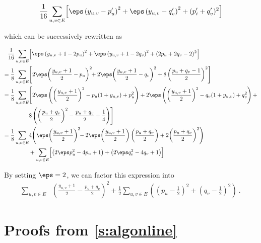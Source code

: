 \begin{equation*}
  \frac{1}{16} \sum_{u,v \in E} \Bigl[ \eps\left(y_{u,v} - p_u'\right)^2 + \eps\left(y_{u,v} - q_v'\right)^2 + (p'_i+q_v')^2 \Bigr]
\end{equation*}

which can be successively rewritten as

\begin{align*}
  \frac{1}{16} \sum_{u,v \in E} & \Bigl[ \eps\left(y_{u,v}+1 - 2p_u\right)^2 + \eps\left(y_{u,v}+1 - 2q_v\right)^2
	+ (2p_u +2q_v -2)^2 \Bigr]
\\=
	\frac{1}{8} \sum_{u,v \in E} & \Biggl[ 2\eps\!\left(\frac{y_{u,v}+1}{2} - p_u\right)^2\!\! +  2\eps\!\left(\frac{y_{u,v}+1}{2} - q_v\right)^2
	+ 8\left(\frac{p_u +q_v -1}{2}\right)^2 \Biggr]
\\=
  \frac{1}{8}\sum_{u,v \in E} & \Biggl[ 2\eps\left(\left(\frac{y_{u,v}+1}{2}\right)^2 -
    p_u(1+y_{u,v}) + p_u^2\right) + %
                              2\eps\left(\left(\frac{y_{u,v}+1}{2}\right)^2 - q_v(1+y_{u,v}) + q_v^2\right) +  \\
                              & 8\left(\left(\frac{p_u +q_v}{2}\right)^2 - \frac{p_u+q_v}{2} + \frac{1}{4} \right) \Biggr]
\\=
  \frac{1}{8}\sum_{u,v \in E} & 4\Biggl(\eps\!\left(\frac{y_{u,v}+1}{2}\right)^2\!\! -
  2\eps\!\left(\frac{y_{u,v}+1}{2}\right)\left(\frac{p_u+q_v}{2}\right)
  + 2\!\left(\frac{p_u +q_v}{2}\right)^2\Biggr)
\\&+
  \sum_{u,v \in E} \Bigl[ \left(2\eps p_u^2 - 4p_u + 1\right) + \left(2\eps q_v^2 - 4q_v + 1\right) \Bigr]
\end{align*}

By setting $\eps=2$, we can factor this expression into 
\begin{align*}
  \sum_{u,v \in E} &\left(\frac{y_{u,v}+1}{2} - \frac{p_u+q_v}{2}\right)^2
  + \frac{1}{2}\sum_{u,v \in E} \left(\left(p_u - \frac{1}{2}\right )^2 + \left(q_v -
  \frac{1}{2}\right)^2 \right)~.
\end{align*}

\section{Proofs from \autoref{s:algonline}}

